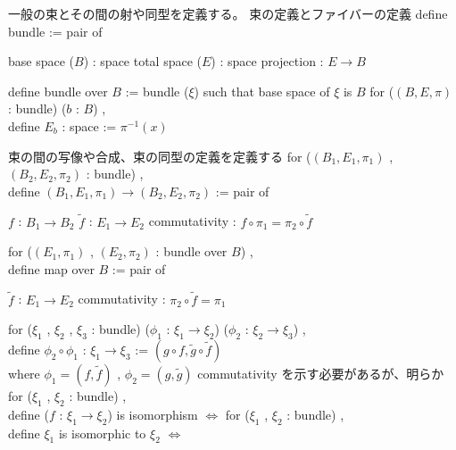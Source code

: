 \begin{Definition}
\itemnote
  一般の束とその間の射や同型を定義する。
\itemnote
  束の定義とファイバーの定義
\itemdefi
  define bundle := pair of
  \begin{itemize}
    \itemenum base space (\(B\)) : space
    \itemenum total space (\(E\)) : space
    \itemenum projection : \(E \to B\)
  \end{itemize}
\itemdefi
  define bundle over \(B\) := bundle (\(\xi\)) such that base space of \(\xi\) is \(B\)
\itemdefi
  for (\((B , E , \pi)\) : bundle) (\(b\) : \(B\)) ,\\
  define \(E_b\) : space := \(\pi^{-1}(x)\)
\end{Definition}

\begin{Definition}
\itemnote
  束の間の写像や合成、束の同型の定義を定義する
\itemdefi
  for (\((B_1 , E_1 , \pi_1)\) , \((B_2 , E_2 , \pi_2)\) : bundle) ,\\
  define \((B_1 , E_1 , \pi_1) \to (B_2 , E_2 , \pi_2)\) := pair of
  \begin{itemize}
    \itemenum \(f\) : \(B_1 \to B_2\)
    \itemenum \(\tilde{f}\) : \(E_1 \to E_2\)
    \itemwith commutativity : \(f \circ \pi_1 = \pi_2 \circ \tilde{f}\)
  \end{itemize}
\itemdefi
  for (\((E_1 , \pi_1)\) , \((E_2 , \pi_2)\) : bundle over \(B\)) ,\\
  define map over \(B\) := pair of
  \begin{itemize}
    \itemenum \(\tilde{f}\) : \(E_1 \to E_2\)
    \itemenum commutativity : \(\pi_2 \circ \tilde{f} = \pi_1\)
  \end{itemize}
\itemdefi
  for (\(\xi_1\) , \(\xi_2\) , \(\xi_3\) : bundle) (\(\phi_1\) : \(\xi_1 \to \xi_2\)) (\(\phi_2\) : \(\xi_2 \to \xi_3\)) ,\\
  define \(\phi_2 \circ \phi_1\) : \(\xi_1 \to \xi_3\) := \((g \circ f , \tilde{g} \circ \tilde{f})\) \\
  where \(\phi_1 = (f , \tilde{f})\) , \(\phi_2 = (g , \tilde{g})\)
\itemprof
  commutativity を示す必要があるが、明らか
\itemdefi
  for (\(\xi_1\) , \(\xi_2\) : bundle) ,\\
  define (\(f\) : \(\xi_1 \to \xi_2\)) is isomorphism \(\iff\) 
\itemdefi
  for (\(\xi_1\) , \(\xi_2\) : bundle) ,\\
  define \(\xi_1\) is isomorphic to \(\xi_2\) \(\iff\) 
\end{Definition}

